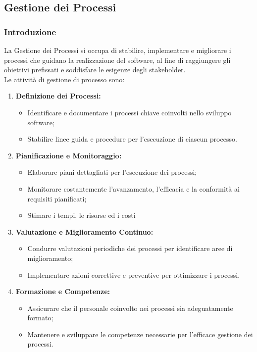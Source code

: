 \subsection{Gestione dei Processi}

\subsubsection{Introduzione}
La Gestione dei Processi si occupa di stabilire, implementare e migliorare i processi che guidano la realizzazione del software, al fine di raggiungere gli obiettivi prefissati e soddisfare le esigenze degli stakeholder.
\\
Le attività di gestione di processo sono:
\begin{enumerate}
    \item \textbf{Definizione dei Processi:}
      \begin{itemize}
        \item Identificare e documentare i processi chiave coinvolti nello sviluppo software;
        \item Stabilire linee guida e procedure per l'esecuzione di ciascun processo.
      \end{itemize}
  
    \item \textbf{Pianificazione e Monitoraggio:}
      \begin{itemize}
        \item Elaborare piani dettagliati per l'esecuzione dei processi;
        \item Monitorare costantemente l'avanzamento, l'efficacia e la conformità ai requisiti pianificati;
        \item Stimare i tempi, le risorse ed i costi
      \end{itemize}
  
    \item \textbf{Valutazione e Miglioramento Continuo:}
      \begin{itemize}
        \item Condurre valutazioni periodiche dei processi per identificare aree di miglioramento;
        \item Implementare azioni correttive e preventive per ottimizzare i processi.
      \end{itemize}
  
    \item \textbf{Formazione e Competenze:}
      \begin{itemize}
        \item Assicurare che il personale coinvolto nei processi sia adeguatamente formato;
        \item Mantenere e sviluppare le competenze necessarie per l'efficace gestione dei processi.
      \end{itemize}
  

\end{enumerate}
